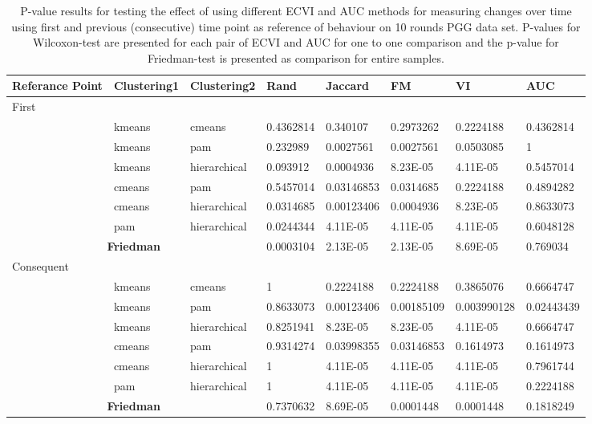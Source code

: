 \begin{landscape}

\begin{table}[]
	\centering
	\caption{P-value results for testing the effect of using different ECVI and AUC methods for measuring changes over time using first and previous (consecutive) time point as reference of behaviour on 10 rounds PGG data set. P-values for Wilcoxon-test are presented for each pair of ECVI and AUC for one to one comparison and the p-value for Friedman-test is presented as comparison for entire samples.}
	\label{tab:Pvalue10PGGECVIDiff}
	\begin{tabular}{llllllll}\toprule
		Referance Point & Clustering1 & Clustering2  & Rand        & Jaccard     & FM          & VI          & AUC        \\\midrule
		First\\ 
		& kmeans      & cmeans       & 0.4362814   & 0.340107    & 0.2973262   & 0.2224188   & 0.4362814  \\
		& kmeans      & pam          & 0.232989    & 0.0027561   & 0.0027561   & 0.0503085   & 1          \\
		& kmeans      & hierarchical & 0.093912    & 0.0004936   & 8.23E-05    & 4.11E-05    & 0.5457014  \\
		& cmeans      & pam          & 0.5457014   & 0.03146853  & 0.0314685   & 0.2224188   & 0.4894282  \\
		& cmeans      & hierarchical & 0.0314685   & 0.00123406  & 0.0004936   & 8.23E-05    & 0.8633073  \\
		& pam         & hierarchical & 0.0244344   & 4.11E-05    & 4.11E-05    & 4.11E-05    & 0.6048128  \\
		\multicolumn{3}{c}{\textbf{Friedman}}     & 0.0003104   & 2.13E-05    & 2.13E-05    & 8.69E-05    & 0.769034   \\
		Consequent  \\
		& kmeans      & cmeans       & 1           & 0.2224188   & 0.2224188   & 0.3865076   & 0.6664747  \\
		& kmeans      & pam          & 0.8633073   & 0.00123406  & 0.00185109  & 0.003990128 & 0.02443439 \\
		& kmeans      & hierarchical & 0.8251941   & 8.23E-05    & 8.23E-05    & 4.11E-05    & 0.6664747  \\
		& cmeans      & pam          & 0.9314274   & 0.03998355  & 0.03146853  & 0.1614973   & 0.1614973  \\
		& cmeans      & hierarchical & 1           & 4.11E-05    & 4.11E-05    & 4.11E-05    & 0.7961744  \\
		& pam         & hierarchical & 1           & 4.11E-05    & 4.11E-05    & 4.11E-05    & 0.2224188  \\
		\multicolumn{3}{c}{\textbf{Friedman}}     & 0.7370632   & 8.69E-05    & 0.0001448 & 0.0001448 & 0.1818249 \\
		\bottomrule 
	\end{tabular}
\end{table}

\end{landscape}



